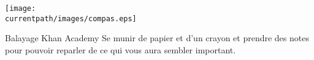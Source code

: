 

\hspace{1cm}

\begin{center}
    \texttt{[image: \\currentpath/images/compas.eps]}
\end{center}

\hspace{1cm}

\begin{center}
    \begin{myBox}{Balayage Khan Academy}
        Se munir de papier et d'un crayon et prendre des notes pour pouvoir reparler de ce qui vous aura sembler important.

        \bigskip        
    \end{myBox}
\end{center}

% 
